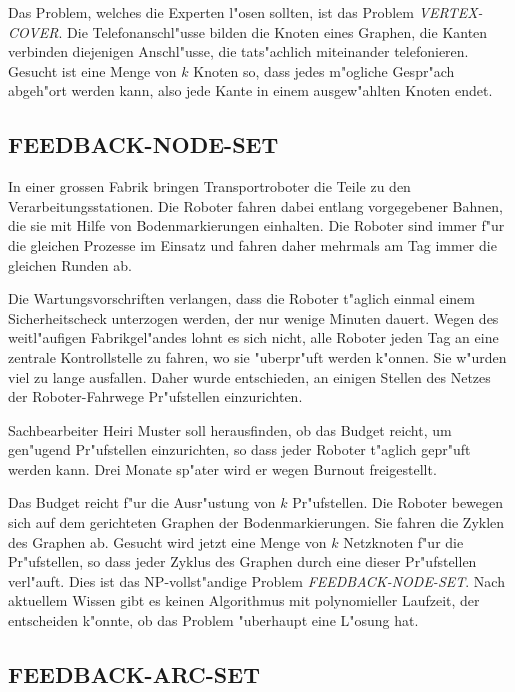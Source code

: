 \medskip

Das Problem, welches die Experten l"osen sollten, ist das Problem
{\it VERTEX-COVER}. Die Telefonanschl"usse bilden die Knoten eines Graphen,
die Kanten verbinden diejenigen Anschl"usse, die tats"achlich miteinander
telefonieren. Gesucht ist eine Menge von $k$ Knoten so, dass jedes
m"ogliche Gespr"ach abgeh"ort werden kann, also jede Kante in einem
ausgew"ahlten Knoten endet.


\subsection{FEEDBACK-NODE-SET}
In einer grossen Fabrik bringen Transportroboter die Teile zu den
Verarbeitungsstationen.  Die Roboter fahren dabei entlang vorgegebener
Bahnen, die sie mit Hilfe von Bodenmarkierungen einhalten.  Die Roboter
sind immer f"ur die gleichen Prozesse im Einsatz und fahren daher mehrmals
am Tag immer die gleichen Runden ab.

Die Wartungsvorschriften verlangen, dass die Roboter t"aglich einmal einem
Sicherheitscheck unterzogen werden, der nur wenige Minuten dauert. Wegen
des weitl"aufigen Fabrikgel"andes lohnt es sich nicht, alle Roboter jeden
Tag an eine zentrale Kontrollstelle zu fahren, wo sie "uberpr"uft werden
k"onnen. Sie w"urden viel zu lange ausfallen. Daher wurde entschieden, an
einigen Stellen des Netzes der Roboter-Fahrwege Pr"ufstellen einzurichten.

Sachbearbeiter Heiri Muster soll herausfinden, ob das Budget reicht,
um gen"ugend Pr"ufstellen einzurichten, so dass jeder Roboter t"aglich
gepr"uft werden kann.
Drei Monate sp"ater wird er wegen Burnout freigestellt.

\medskip

Das Budget reicht f"ur die Ausr"ustung von $k$ Pr"ufstellen.
Die Roboter bewegen sich auf dem gerichteten Graphen der Bodenmarkierungen.
Sie fahren die Zyklen des Graphen ab. Gesucht wird jetzt eine Menge
von $k$ Netzknoten f"ur die Pr"ufstellen, so dass jeder Zyklus des Graphen
durch eine dieser Pr"ufstellen verl"auft.
Dies ist das NP-vollst"andige Problem {\it FEEDBACK-NODE-SET}.
Nach aktuellem Wissen gibt es keinen Algorithmus mit polynomieller
Laufzeit, der entscheiden k"onnte, ob das Problem "uberhaupt eine
L"osung hat.

\subsection{FEEDBACK-ARC-SET}


